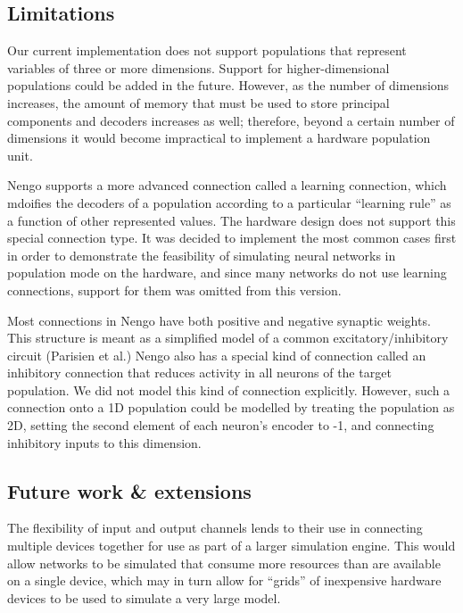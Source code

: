 \documentclass[english]{article}
\begin{document}
\subsection{Limitations}

Our current implementation does not support populations that represent variables of three or more dimensions.
Support for higher-dimensional populations could be added in the future.
However, as the number of dimensions increases, the
amount of memory that must be used to store principal components and
decoders increases as well; therefore, beyond a certain number of
dimensions it would become impractical to implement a hardware
population unit.  

Nengo supports a more advanced connection called a learning connection,
which mdoifies the decoders of a population according to a particular ``learning rule''
as a function of other represented values. The hardware design does not support this special connection type.
It was decided to implement the most common cases first in order to demonstrate the feasibility of simulating
neural networks in population mode on the hardware, and since many networks do not use learning connections,
support for them was omitted from this version.

Most connections in Nengo have both positive and negative synaptic weights. This
structure is meant as a simplified model of a common excitatory/inhibitory circuit
(Parisien et al.) %
Nengo also has a special kind of connection called an inhibitory connection that
reduces activity in all neurons of the target population. We did not model this kind of connection explicitly.
However, such a connection onto a 1D population could be modelled by treating the population as 2D,
setting the second element of each neuron's encoder to -1, and connecting inhibitory inputs to this dimension.


\subsection{Future work \& extensions}


The flexibility of input and output channels lends to their use in connecting multiple devices together for use as part of a larger simulation engine.
This would allow networks to be simulated that consume more resources than are available on a single device, which may in turn allow
for ``grids'' of inexpensive hardware devices to be used to simulate a very large model.
\end{document}
